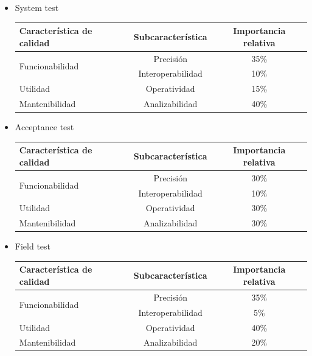 \documentclass[
11pt, %
]{charter}
\begin{document}
\begin{itemize}
	\item System test
	
		\begin{table}[H]
		\centering
		\begin{tabular}{|l|c|c|}
		\hline
		\rowcolor[HTML]{C0C0C0}
		Característica de calidad	& Subcaracterística		& Importancia relativa\\ \hline
		\multirow{2}{*}{Funcionabilidad} 			& Precisión 		& 35\%	\\\cline{2-3}
		  										& Interoperabilidad 	& 10\%							\\ \hline
		Utilidad					& Operatividad						& 15\%						\\ \hline
		Mantenibilidad				& Analizabilidad					& 40\%						\\ \hline
		\end{tabular}
		\label{tab:caracteristicasDeCalidad}
		\end{table}

	\item Acceptance test
	
		\begin{table}[H]
		\centering
		\begin{tabular}{|l|c|c|}
		\hline
		\rowcolor[HTML]{C0C0C0}
		Característica de calidad	& Subcaracterística		& Importancia relativa\\ \hline
		\multirow{2}{*}{Funcionabilidad} 			& Precisión 		& 30\%	\\\cline{2-3}
		  										& Interoperabilidad 	& 10\%							\\ \hline
		Utilidad					& Operatividad						& 30\%						\\ \hline
		Mantenibilidad				& Analizabilidad					& 30\%						\\ \hline
		\end{tabular}
		\label{tab:caracteristicasDeCalidad}
		\end{table}

	\item Field test
	
		\begin{table}[H]
		\centering
		\begin{tabular}{|l|c|c|}
		\hline
		\rowcolor[HTML]{C0C0C0}
		Característica de calidad	& Subcaracterística		& Importancia relativa\\ \hline
		\multirow{2}{*}{Funcionabilidad} 			& Precisión 		& 35\%	\\\cline{2-3}
		  										& Interoperabilidad 	& 5\%							\\ \hline
		Utilidad					& Operatividad						& 40\%						\\ \hline
		Mantenibilidad				& Analizabilidad					& 20\%						\\ \hline
		\end{tabular}
		\label{tab:caracteristicasDeCalidad}
		\end{table}

\end{itemize}
\end{document}
